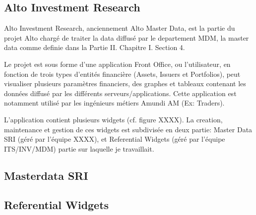 \subsection{Alto Investment Research}
\par Alto Investment Research, anciennement Alto Master Data, est la partie du projet Alto chargé de traiter la data diffusé par le departement MDM, la master data comme definie dans la Partie II. Chapitre I. Section 4.
\par Le projet est sous forme d'une application Front Office, ou l'utilisateur, en fonction de trois types d'entités financière (Assets, Issuers et Portfolios), peut visualiser plusieurs paramètres financiers, des graphes et tableaux contenant les données diffusé par les différents serveurs/applications. Cette application est notamment utilisé par les ingénieurs métiers Amundi AM (Ex: Traders).
\par L'application contient plusieurs widgets (cf. figure XXXX). La creation, maintenance et gestion de ces widgets est subdivisée en deux partie: Master Data SRI (géré par l'équipe XXXX), et Referential Widgets (géré par l'équipe ITS/INV/MDM) partie sur laquelle je travaillait.
\subsection{Masterdata SRI}
\subsection{Referential Widgets}
